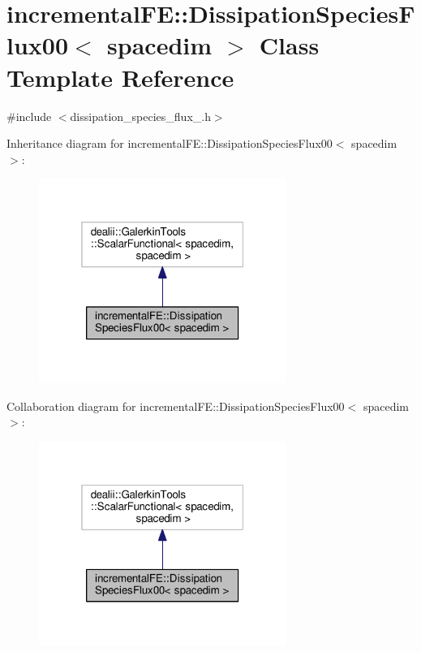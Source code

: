 \hypertarget{classincremental_f_e_1_1_dissipation_species_flux00}{}\section{incremental\+FE\+:\+:Dissipation\+Species\+Flux00$<$ spacedim $>$ Class Template Reference}
\label{classincremental_f_e_1_1_dissipation_species_flux00}


{\ttfamily \#include $<$dissipation\+\_\+species\+\_\+flux\+\_.\+h$>$}



Inheritance diagram for incremental\+FE\+:\+:Dissipation\+Species\+Flux00$<$ spacedim $>$\+:\nopagebreak
\begin{figure}[H]
\begin{center}
\leavevmode
\includegraphics[width=229pt]{classincremental_f_e_1_1_dissipation_species_flux00__inherit__graph}
\end{center}
\end{figure}


Collaboration diagram for incremental\+FE\+:\+:Dissipation\+Species\+Flux00$<$ spacedim $>$\+:\nopagebreak
\begin{figure}[H]
\begin{center}
\leavevmode
\includegraphics[width=229pt]{classincremental_f_e_1_1_dissipation_species_flux00__coll__graph}
\end{center}
\end{figure}
